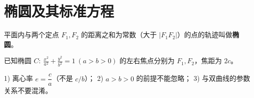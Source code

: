 \chapter{椭圆及其标准方程}

\begin{defbox}[椭圆（定义）]
  平面内与两个定点 $F_1, F_2$ 的距离之和为常数（大于 $|F_1F_2|$）的点的轨迹叫做\textbf{椭圆}。
\end{defbox}

\begin{theorybox}[标准方程与几何性质（提要）]
  \begin{ellipsesummary}
  \end{ellipsesummary}
\end{theorybox}

\begin{examplebox}[例题：求椭圆的方程]
  已知椭圆 $C:\ \frac{x^2}{a^2}+\frac{y^2}{b^2}=1\ (a>b>0)$ 的左右焦点分别为 $F_1,F_2$，焦距为 $2c$。
\end{examplebox}

\begin{notebox}[易错点]
  1) 离心率 $e=\dfrac{c}{a}$（不是 $c/b$）；
  2) $a>b>0$ 的前提不能忽略；
  3) 与双曲线的参数关系不要混淆。
\end{notebox}

